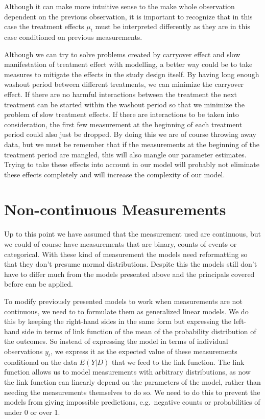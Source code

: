 \documentclass[12pt,a4paper,leqno]{report}
\theoremstyle{plain}
\theoremstyle{definition}
\theoremstyle{remark}
\begin{document}
Although it can make more intuitive sense to the make whole observation dependent on
the previous observation, it is important to recognize that in this case the treatment effects
\(\mu_t\) must be interpreted differently as they are in this case conditioned on
previous measurements.

Although we can try to solve problems created by carryover effect and slow manifestation
of treatment effect with modelling, a better way could be to take
measures to mitigate the effects in the study design itself. By having long
enough washout period between different treatments, we can minimize the carryover effect. If
there are no harmful interactions between the treatment the next treatment
can be started within the washout period so that we minimize the problem of
slow treatment effects. If there are interactions to be taken into
consideration, the first few measurement at the beginning of
each treatment period could also just be dropped. By doing this we are of course
throwing away data, but we must be remember that if the measurements at the
beginning of the treatment period are mangled, this will also mangle our parameter estimates.
Trying to take these effects into account in our model will probably not eliminate these
effects completely and will increase the complexity of our model.

\section{Non-continuous Measurements}\label{noncontinuous}

Up to this point we have assumed that the measurement used are continuous, but we
could of course have measurements that are binary, counts of events or categorical.
With these kind of measurement the models need reformatting so that they don't
presume normal distributions. Despite this the models still don't have to differ much
from the models presented above and the principals covered before can be applied.

To modify previously presented models to work when measurements are not continuous, we need to to formulate them
as generalized linear models. We do this by keeping the right-hand sides in the same form but expressing the left-hand
side in terms of link function of the mean of the probability distribution of the outcomes.
So instead of expressing the model in terms
of individual observations \(y_t\), we express it as the expected value of these measurements conditional
on the data \(E(Y|D)\) that we feed to the link function.
The link function allows us to model measurements with arbitrary distributions, as now the link function can linearly depend on the parameters of the model,
rather than needing the measurements themselves to do so. We need to do this to prevent the models from giving impossible predictions,
e.g.\ negative counts or probabilities of under 0 or over 1.
\end{document}
